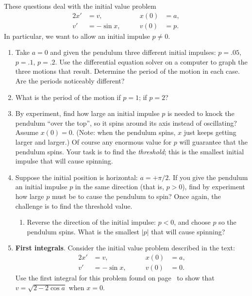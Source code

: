 These questions deal with the initial value problem
\begin{alignat*}{2}
x' &= v, 	&\qquad x(0) &= a, \\
v' &= -\sin{x}, &\qquad v(0) &= p.
\end{alignat*}
In particular, we want to allow an initial impulse $p \neq 0$.  	


\begin{enumerate}
\item Take $a = 0$ and given the pendulum three different initial
impulses: $p = .05$, $p = .1$, $p = .2$.  Use the differential
equation solver on a computer to graph the three motions that result.
Determine the period of the motion in each case.  Are the periods
noticeably different?


\item What is the period of the motion if $p = 1$; if $p = 2$?


\item By experiment, find how large an initial impulse $p$ is needed to
knock the pendulum ``over the top'', so it spins around its axis
instead of oscillating?  Assume $x(0) = 0$.  (Note: when the pendulum
spins, $x$ just keeps getting larger and larger.)  Of course any
enormous value for $p$ will guarantee that the pendulum spins.  Your
task is to find the {\em threshold\/}; this is the smallest initial
impulse that will cause spinning.  



\item Suppose the initial position is horizontal: $a = +\pi/2$.  If
you give the pendulum an initial impulse $p$ in the same direction
(that is, $p > 0$), find by experiment how large $p$ must be to cause
the pendulum to spin?  Once again, the challenge is to find the
threshold value.



  \begin{enumerate}
  \item Reverse the direction of the initial impulse: $p < 0$, and choose
$p$ so the pendulum spins.  What is the smallest $|p|$ that will cause
spinning?


\end{enumerate}
\item {\bf First integrals}.  Consider the initial value problem
described in the text:
\begin{alignat*}{2}
x' &= v, 	&\qquad x(0) &= a, \\
v' &= -\sin{x}, &\qquad v(0) &= 0.
\end{alignat*}
Use the first integral for this problem found on page~\pageref{pend}
to show that $v = \sqrt{2 - 2\cos{a}}$ when $x = 0$.



\end{enumerate}
